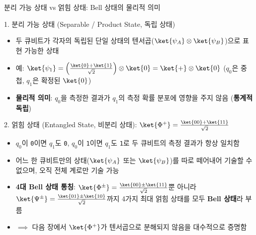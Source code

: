 \documentclass[aspectratio=169, 10pt]{beamer}
\begin{document}
\begin{frame}{분리 가능 상태 vs 얽힘 상태: Bell 상태의 물리적 의미}
    \begin{qcblock}{1. 분리 가능 상태 (Separable / Product State, 독립 상태)}
        \begin{itemize}
            \item 두 큐비트가 각자의 독립된 단일 상태의 텐서곱($\ket{\psi_A} \otimes \ket{\psi_B}$)으로 표현 가능한 상태
            \pause
            \item 예: $\ket{\psi_1} = \left(\frac{\ket{0}+\ket{1}}{\sqrt{2}}\right) \otimes \ket{0} = \ket{+}\otimes\ket{0}$ ($q_0$은 중첩, $q_1$은 확정된 $\ket{0}$)
            \pause
            \item \textbf{물리적 의미}: $q_0$을 측정한 결과가 $q_1$의 측정 확률 분포에 영향을 주지 않음 (\textbf{통계적 독립})
        \end{itemize}
    \end{qcblock}
    \pause
    \vspace{0.15cm}
    \begin{qcalert}{2. 얽힘 상태 (Entangled State, 비분리 상태): $\ket{\Phi^+} = \frac{\ket{00}+\ket{11}}{\sqrt{2}}$}
        \begin{itemize}
            \item $q_0$이 \texttt{0}이면 $q_1$도 \texttt{0}, $q_0$이 \texttt{1}이면 $q_1$도 \texttt{1}로 두 큐비트의 측정 결과가 항상 일치함
            \pause
            \item 어느 한 큐비트만의 상태($\ket{\psi_A}$ 또는 $\ket{\psi_B}$)를 따로 떼어내어 기술할 수 없으며, 오직 전체 계로만 기술 가능
            \pause
            \item \textbf{4대 Bell 상태 통칭}: $\ket{\Phi^\pm} = \frac{\ket{00}\pm\ket{11}}{\sqrt{2}}$뿐 아니라 $\ket{\Psi^\pm} = \frac{\ket{01}\pm\ket{10}}{\sqrt{2}}$까지 4가지 최대 얽힘 상태를 모두 \textbf{Bell 상태}라 부름
            \pause
            \item $\implies$ 다음 장에서 $\ket{\Phi^+}$가 텐서곱으로 분해되지 않음을 대수적으로 증명함
        \end{itemize}
    \end{qcalert}
\end{frame}
\end{document}
